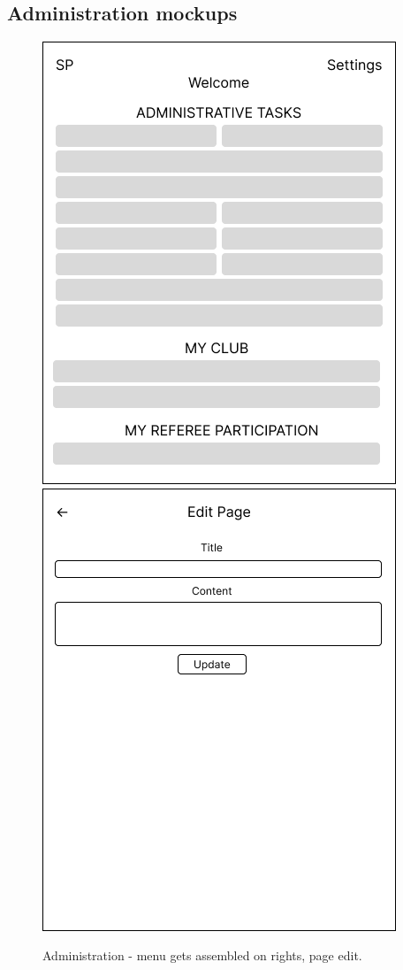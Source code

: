 \subsection*{Administration mockups}
\begin{figure}[h]	
	\centering	
\includegraphics[scale=0.457]{img/A-administrace.png}
\includegraphics[scale=0.457]{img/A-edit-page.png}

\caption{Administration - menu gets assembled on rights, page edit.}
\label{fig1.4:feprivatepages1}
\end{figure}
